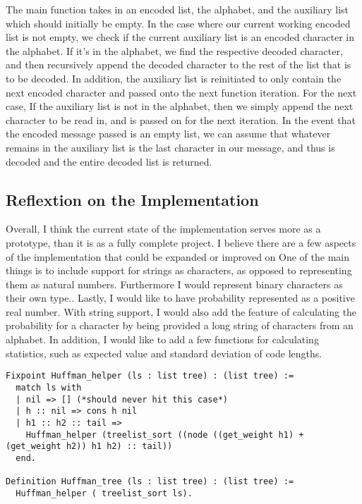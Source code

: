 \documentclass{llncs}
\begin{document}
The main function takes in an encoded list, the alphabet, and the auxiliary list which should initially be empty. In the case where our current working encoded list is not empty, we check if the current auxiliary list is an encoded character in the alphabet. If it’s in the alphabet, we find the respective decoded character, and then recursively append the decoded character to the rest of the list that is to be decoded. In addition, the auxiliary list is reinitiated to only contain the next encoded character and passed onto the next function iteration.  For the next case, If the auxiliary list is not in the alphabet, then we simply append the next character to be read in, and is passed on for the next iteration. In the event that the encoded message passed is an empty list, we can assume that whatever remains in the auxiliary list is the last character in our message, and thus is decoded and the entire decoded list is returned. 

\subsection{Reflextion on the Implementation}

Overall, I think the current state of the implementation serves more as a prototype, than it is as a fully complete project. I believe there are a few aspects of the implementation that could be expanded or improved on
One of the main things is to include support for strings as characters, as opposed to representing them as natural numbers. Furthermore I would represent binary characters as their own type.. Lastly, I would like to have probability represented as a positive real number. 
With string support, I would also add the feature of calculating the probability for a character by being provided a long string of characters from an alphabet. In addition, I would like to add a few functions for calculating statistics, such as expected value and standard deviation of code lengths. 

\begin{lstlisting}
Fixpoint Huffman_helper (ls : list tree) : (list tree) :=
  match ls with
  | nil => [] (*should never hit this case*)
  | h :: nil => cons h nil
  | h1 :: h2 :: tail =>
    Huffman_helper (treelist_sort ((node ((get_weight h1) + (get_weight h2)) h1 h2) :: tail))
  end.

Definition Huffman_tree (ls : list tree) : (list tree) :=
  Huffman_helper ( treelist_sort ls).
\end{lstlisting}
\end{document}
